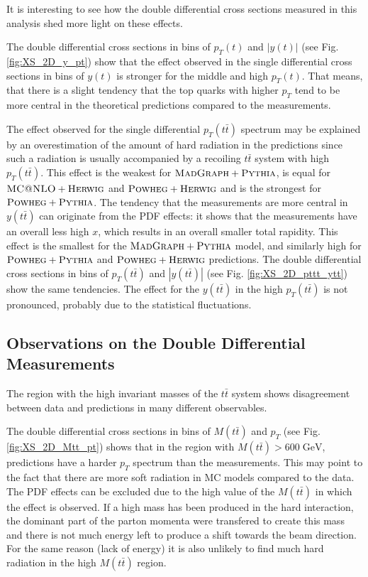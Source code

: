 It is interesting to see how the double differential cross sections measured in this analysis shed more light on these effects.

The double differential cross sections in bins of $p_{T}(t)$ and $|y(t)|$ (see Fig. \ref{fig:XS_2D_y_pt}) show that the effect observed in
the single differential cross sections in bins of $y(t)$ is stronger for the middle and high $p_{T}(t)$. That means, that there is a slight 
tendency that the top quarks with higher $p_{T}$ tend to be more central in the theoretical predictions compared to the measurements.

The effect observed for the single differential $p_{T}(t\bar{t})$ spectrum may be explained by an overestimation of the amount of hard radiation
in the predictions since such a radiation is usually accompanied by a recoiling $t\bar{t}$ system with high $p_{T}(t\bar{t})$. This effect is the weakest 
for $\textsc{MadGraph}+\textsc{Pythia}$, is equal for $\textsc{MC@NLO}+\textsc{Herwig}$ and $\textsc{Powheg}+\textsc{Herwig}$ and is the strongest for
$\textsc{Powheg}+\textsc{Pythia}$. The tendency that the measurements are more central in $y(t\bar{t})$ can originate from the PDF effects: it shows that the 
measurements have an overall less high $x$, which results in an overall smaller total rapidity. 
This effect is the smallest for the $\textsc{MadGraph}+\textsc{Pythia}$ model, and similarly high for $\textsc{Powheg}+\textsc{Pythia}$ and
$\textsc{Powheg}+\textsc{Herwig}$ predictions. The double differential cross sections in bins of $p_{T}(t\bar{t})$ and $|y(t\bar{t})|$ (see Fig. \ref{fig:XS_2D_pttt_ytt}) 
show the same tendencies. The effect for the $y(t\bar{t})$ in the high $p_{T}(t\bar{t})$ is not pronounced, probably due to the statistical fluctuations.

\subsection{Observations on the Double Differential Measurements}\label{sec:ddxsec_discuss}

The region with the high invariant masses of the $t\bar{t}$ system shows disagreement between data and predictions in many different observables.

The double differential cross sections in bins of $M(t\bar{t})$ and $p_{T}$ (see Fig. \ref{fig:XS_2D_Mtt_pt}) shows that in the region with 
$M(t\bar{t}) > 600\;\text{GeV}$, predictions have a harder $p_{T}$ spectrum than the measurements. This may point to the fact that there are 
more soft radiation in MC models compared to the data. The PDF effects can be excluded due to the high value of the $M(t\bar{t})$ in which
the effect is observed. If a high mass has been produced in the hard interaction, the dominant part of the parton momenta were transfered to
create this mass and there is not much energy left to produce a shift towards the beam direction. For the same reason (lack of energy) it is also 
unlikely to find much hard radiation in the high $M(t\bar{t})$ region. 

